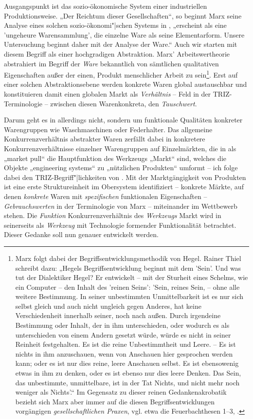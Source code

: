 \documentclass[11pt,a4paper]{article}
\begin{document}
Ausgangspunkt ist das sozio-ökonomische System einer industriellen
Produktionsweise. „Der Reichtum dieser Gesellschaften“, so beginnt Marx seine
Analyse eines solchen sozio-ökonomi"|schen Systems in \cite{MEW23}, „erscheint
als eine 'ungeheure Warensammlung', die einzelne Ware als seine
Elementarform. Unsere Untersuchung beginnt daher mit der Analyse der Ware.“
Auch wir starten mit diesem Begriff als einer hochgradigen Abstraktion.  Marx'
Arbeitswertheorie abstrahiert im Begriff der \emph{Ware} bekanntlich von
sämtlichen qualitativen Eigenschaften außer der einen, Produkt menschlicher
Arbeit zu sein\footnote{Marx folgt dabei der Begriffsentwicklungsmethodik von
  Hegel. Rainer Thiel \cite[S. 190]{Thiel2007} schreibt dazu: „Hegels
  Begriffsentwicklung beginnt mit dem 'Sein'. Und was tut der Dialektiker
  Hegel? Er entwickelt – mit der Sturheit eines Schelms, wie ein Computer –
  den Inhalt des 'reinen Seins': 'Sein, reines Sein, -- ohne alle weitere
  Bestimmung. In seiner unbestimmten Unmittelbarkeit ist es nur sich selbst
  gleich und auch nicht ungleich gegen Anderes, hat keine Verschiedenheit
  innerhalb seiner, noch nach außen. Durch irgendeine Bestimmung oder Inhalt,
  der in ihm unterschieden, oder wodurch es als unterschieden von einem Andern
  gesetzt würde, würde es nicht in seiner Reinheit festgehalten. Es ist die
  reine Unbestimmtheit und Leere. – Es ist nichts in ihm anzuschauen, wenn von
  Anschauen hier gesprochen werden kann; oder es ist nur dies reine, leere
  Anschauen selbst. Es ist ebensowenig etwas in ihm zu denken, oder es ist
  ebenso nur dies leere Denken. Das Sein, das unbestimmte, unmittelbare, ist
  in der Tat Nichts, und nicht mehr noch weniger als Nichts'.“ Im Gegensatz zu
  dieser reinen Gedankenakrobatik bezieht sich Marx aber immer auf die diesen
  Begriffsentwicklungen vorgängigen \emph{gesellschaftlichen Praxen},
  vgl. etwa die Feuerbachthesen 1--3, \cite{MEW3}.}.  Erst auf einer solchen
Abstraktionsebene werden konkrete Waren global austauschbar und konstituieren
damit einen globalen Markt als \emph{Verhältnis} -- Feld in der
TRIZ-Terminologie -- zwischen diesen Warenkonkreta, den \emph{Tauschwert}.

Darum geht es in \cite{TESE2018} allerdings nicht, sondern um funktionale
Qualitäten konkreter Warengruppen wie Waschmaschinen oder Federhalter. Das
allgemeine Konkurrenzverhältnis abstrakter Waren zerfällt dabei in konkretere
Konkurrenzverhältnisse einzelner Warengruppen auf Einzelmärkten, die in
\cite{TESE2018} als „market pull“ die Hauptfunktion des Werkzeugs „Markt“
sind, welches die Objekte „engineering systems“ zu „nützlichen Produkten“
umformt -- ich folge dabei den TRIZ-Begriff"|lichkeiten von \cite{TT}.  Mit
der Marktgängigkeit von Produkten ist eine erste Struktureinheit im Obersystem
identifiziert -- konkrete Märkte, auf denen \emph{konkrete} Waren mit
\emph{spezifischen} funktionalen Eigenschaften -- \emph{Gebrauchswerten} in
der Terminologie von Marx -- miteinander im Wettbewerb stehen.  Die
\emph{Funktion} Konkurrenzverhältnis des \emph{Werkzeugs} Markt wird in
\cite{TESE2018} seinerseits als \emph{Werkzeug} mit Technologie formender
Funktionalität betrachtet.  Dieser Gedanke soll nun genauer entwickelt werden.
\end{document}
